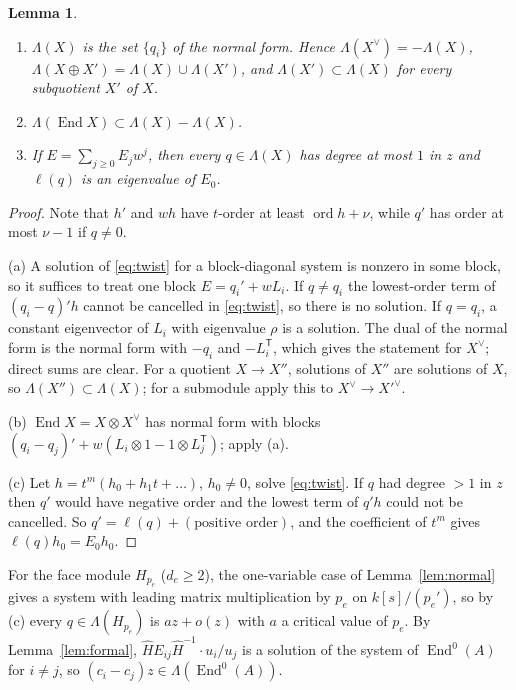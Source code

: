 \documentclass[11pt]{article}
\numberwithin{equation}{section}
\newtheorem{lemma}[theorem]{Lemma}
\theoremstyle{definition}
\theoremstyle{remark}
\newcommand{\End}{\operatorname{End}}\newcommand{\Hom}{\operatorname{Hom}}\newcommand{\Span}{\operatorname{span}}
\begin{document}
\begin{lemma}\label{lem:exponents}
\begin{enumerate}[label=\textup{(\alph*)},leftmargin=2.2em]
\item $\Lambda(X)$ is the set $\{q_i\}$ of the normal form. Hence
 $\Lambda(X^\vee)=-\Lambda(X)$,
 $\Lambda(X\oplus X')=\Lambda(X)\cup\Lambda(X')$, and
 $\Lambda(X')\subset\Lambda(X)$ for every subquotient $X'$ of $X$.
\item $\Lambda(\End X)\subset\Lambda(X)-\Lambda(X)$.
\item If $E=\sum_{j\ge0}E_jw^j$, then every $q\in\Lambda(X)$ has degree at most
 $1$ in $z$ and $\ell(q)$ is an eigenvalue of $E_0$.
\end{enumerate}
\end{lemma}
\begin{proof}
Note that $h'$ and $wh$ have $t$-order at least $\operatorname{ord}h+\nu$, while
$q'$ has order at most $\nu-1$ if $q\ne0$.

(a) A solution of \eqref{eq:twist} for a block-diagonal system is nonzero in
some block, so it suffices to treat one block $E=q_i'+wL_i$. If $q\ne q_i$ the
lowest-order term of $(q_i-q)'h$ cannot be cancelled in \eqref{eq:twist}, so
there is no solution. If $q=q_i$, a constant eigenvector of $L_i$ with
eigenvalue $\rho$ is a solution. The dual of the normal form is the normal
form with $-q_i$ and $-L_i^{\mathsf T}$, which gives the statement for $X^\vee$;
direct sums are clear. For a quotient $X\to X''$, solutions of $X''$ are
solutions of $X$, so $\Lambda(X'')\subset\Lambda(X)$; for a submodule apply this
to $X^\vee\to X'^\vee$.

(b) $\End X=X\otimes X^\vee$ has normal form with blocks
$(q_i-q_j)'+w(L_i\otimes1-1\otimes L_j^{\mathsf T})$; apply (a).

(c) Let $h=t^m(h_0+h_1t+\dots)$, $h_0\ne0$, solve \eqref{eq:twist}. If $q$ had
degree $>1$ in $z$ then $q'$ would have negative order and the lowest term of
$q'h$ could not be cancelled. So $q'=\ell(q)+(\text{positive order})$, and the
coefficient of $t^m$ gives $\ell(q)h_0=E_0h_0$.
\end{proof}

For the face module $H_{p_e}$ ($d_e\ge2$), the one-variable case of
Lemma~\ref{lem:normal} gives a system with leading matrix multiplication by
$p_e$ on $k[s]/(p_e')$, so by (c) every $q\in\Lambda(H_{p_e})$ is $az+o(z)$ with
$a$ a critical value of $p_e$. By Lemma~\ref{lem:formal},
$\widehat HE_{ij}\widehat H^{-1}\cdot u_i/u_j$ is a solution of the system of
$\End^0(A)$ for $i\ne j$, so $(c_i-c_j)z\in\Lambda(\End^0(A))$.
\end{document}

